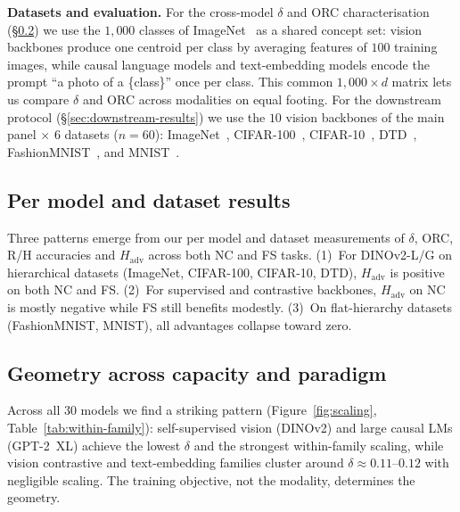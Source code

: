 \documentclass{article}
\begin{document}
\textbf{Datasets and evaluation.} For the cross-model $\delta$ and ORC characterisation (\S\ref{sec:geometry-paradigm}) we use the $1{,}000$ classes of ImageNet~\citep{imagenet} as a shared concept set: vision backbones produce one centroid per class by averaging features of $100$ training images, while causal language models and text-embedding models encode the prompt ``a photo of a \{class\}'' once per class. This common $1{,}000 \times d$ matrix lets us compare $\delta$ and ORC across modalities on equal footing. For the downstream protocol (\S\ref{sec:downstream-results}) we use the $10$ vision backbones of the main panel $\times$ $6$ datasets ($n = 60$): ImageNet~\citep{imagenet}, CIFAR-100~\citep{cifar10}, CIFAR-10~\citep{cifar10}, DTD~\citep{dtd}, FashionMNIST~\citep{fashion}, and MNIST~\citep{mnist}.


\subsection{Per model and dataset results}
\label{sec:complete-results}

Three patterns emerge from our per model and dataset measurements of $\delta$, ORC, R/H accuracies and $H_{\mathrm{adv}}$ across both NC and FS tasks. (1)~For DINOv2-L/G on hierarchical datasets (ImageNet, CIFAR-100, CIFAR-10, DTD), $H_{\mathrm{adv}}$ is positive on both NC and FS. (2)~For supervised and contrastive backbones, $H_{\mathrm{adv}}$ on NC is mostly negative while FS still benefits modestly. (3)~On flat-hierarchy datasets (FashionMNIST, MNIST), all advantages collapse toward zero.

\subsection{Geometry across capacity and paradigm}
\label{sec:geometry-paradigm}

Across all 30 models we find a striking pattern (Figure~\ref{fig:scaling}, Table~\ref{tab:within-family}): self-supervised vision (DINOv2) and large causal LMs (GPT-2~XL) achieve the lowest $\delta$ and the strongest within-family scaling, while vision contrastive and text-embedding families cluster around $\delta \approx 0.11$--$0.12$ with negligible scaling. The training objective, not the modality, determines the geometry.
\end{document}
